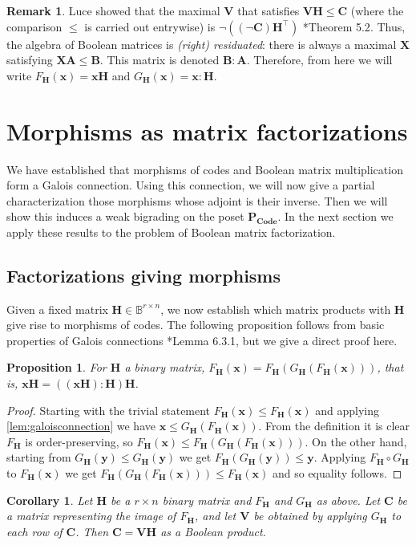 \documentclass[11pt,letterpaper, reqno]{amsart}
\newtheorem{cor}[thm]{Corollary}     %
\newtheorem{prop}[thm]{Proposition}  %
\theoremstyle{definition}
\newtheorem{rmk}[thm]{Remark}
\def\B{\mathbb{B}}
\def\bx{\mathbf{x}}
\def\by{\mathbf{y}}
\def\bA{\mathbf{A}}
\def\bB{\mathbf{B}}
\def\bC{\mathbf{C}}
\def\bH{\mathbf{H}}
\def\bV{\mathbf{V}}
\def\bX{\mathbf{X}}
\def\pcode{\mathbf{P_{Code}}}
\begin{document}
        \begin{rmk}\label{rmk:residual}
            Luce showed that the maximal $\bV$ that satisfies $\bV\bH \leq \bC$ (where the comparison $\leq$ is carried out entrywise) is $\lnot((\lnot\bC) \bH^\top)$ \cite{luce1952note}*{Theorem 5.2}.
            Thus, the algebra of Boolean matrices is \emph{(right) residuated}: there is always a maximal $\bX$ satisfying $\bX\bA \leq \bB$.
            This matrix is denoted $\bB : \bA$. Therefore, from here we will write $F_\bH(\bx) = \bx\bH$ and $G_\bH(\bx) = \bx:\bH$.
        \end{rmk}
        
\section{Morphisms as matrix factorizations}\label{sec:adjoints}
    We have established that morphisms of codes and Boolean matrix multiplication form a Galois connection.
    Using this connection, we will now give a partial characterization those morphisms whose adjoint is their inverse.
    Then we will show this induces a weak bigrading on the poset $\pcode$.
    In the next section we apply these results to the problem of Boolean matrix factorization.
    
    \subsection{Factorizations giving morphisms} %
        Given a fixed matrix $\bH \in \B^{r \times n}$, we now establish which matrix products with $\bH$ give rise to morphisms of codes. The following proposition follows from basic properties of Galois connections \cite{Bergman}*{Lemma 6.3.1}, but we give a direct proof here.
        \begin{prop}\label{prop:imagefixedpoints}
            For $\bH$ a binary matrix, $F_\bH(\bx) = F_\bH(G_\bH(F_\bH(\bx)))$, that is, $\bx\bH = ((\bx\bH):\bH)\bH$.
        \end{prop}
        \begin{proof}
            Starting with the trivial statement $F_\bH(\bx) \leq F_\bH(\bx)$ and applying \cref{lem:galoisconnection} we have $\bx \leq G_\bH(F_\bH(\bx))$. From the definition it is clear $F_\bH$ is order-preserving, so $F_\bH(\bx) \leq F_\bH(G_\bH(F_\bH(\bx)))$. On the other hand, starting from $G_\bH(\by) \leq G_\bH(\by)$ we get $F_\bH(G_\bH(\by)) \leq \by$. Applying $F_\bH \circ G_\bH$ to $F_\bH(\bx)$ we get $F_\bH(G_\bH(F_\bH(\bx))) \leq F_\bH(\bx)$ and so equality follows.
        \end{proof}
        \begin{cor}\label{lem:useHtogetfactorization}
            Let $\bH$ be a $r \times n$ binary matrix and $F_\bH$ and $G_\bH$ as above. Let $\bC$ be a matrix representing the image of $F_\bH$, and let $\bV$ be obtained by applying $G_\bH$ to each row of $\bC$. Then $\bC = \bV\bH$ as a Boolean product.
        \end{cor}
        
\end{document}
